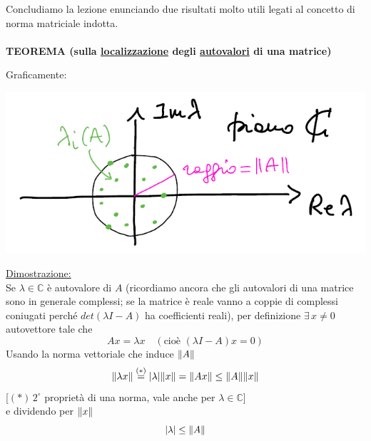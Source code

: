 \documentclass[12pt,a4paper]{article}
\DeclarePairedDelimiter{\abs}{\lvert}{\rvert}
\DeclarePairedDelimiter{\norma}{\lVert}{\rVert}
\begin{document}
\bigskip
Concludiamo la lezione enunciando due risultati molto utili legati al concetto di norma matriciale indotta.\\\\
\textbf{TEOREMA (sulla \underline{localizzazione} degli \underline{autovalori} di una matrice)}
\begin{center}
\end{center}
Graficamente:
\begin{center}
    \includegraphics[scale=0.5]{lez19_img2.png}    
\end{center}
\underline{Dimostrazione:}\\
Se $\lambda \in \mathbb{C}$ è autovalore di $A$ (ricordiamo ancora che gli autovalori di una matrice sono in generale complessi; se la matrice è reale vanno a coppie di complessi coniugati perché $det(\lambda I-A)$ ha coefficienti reali), per definizione $\exists \, x \ne 0$ autovettore tale che
\[Ax = \lambda x \quad (\text{cioè } (\lambda I-A)x = 0)\]
Usando la norma vettoriale che induce $\norma{A}$
\[\norma{\lambda x} \overset{(*)}{=} \abs{\lambda}\norma{x} = \norma{Ax} \le \norma{A}\norma{x}\]
[$(*)\, 2^{\circ}$ proprietà di una norma, vale anche per $\lambda \in \mathbb{C}$] \\
e dividendo per $\norma{x}$
\[\abs{\lambda} \le \norma{A}\]
\end{document}
